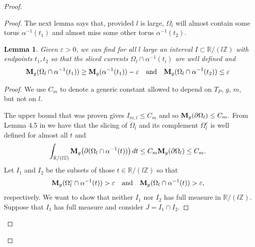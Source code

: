 \documentclass[11pt]{amsart}
\def\R{\mathbb R}
\def\Z{\mathbb Z}
\newtheorem{lemm}[thm]{Lemma}
\theoremstyle{remark}
\theoremstyle{definition}
\begin{document}
\begin{proof}
\begin{proof}
			{The next lemma says that, provided $l$ is large, $\Omega_l$ will almost contain some torus $\alpha^{-1}(t_1)$ and almost miss some other torus $\alpha^{-1}(t_2)$.}
			\begin{lemm}\label{slicing.argument} Given $\varepsilon>0$, we can find for all $l$ large an interval $I\subset \R/(l\Z)$ with endpoints $t_1,t_2$ so that the sliced currents $\Omega_l\cap \alpha^{-1}(t_i)$ are well defined and 
				$${\bf M}_g(\Omega_l\cap \alpha^{-1}(t_1))\geq {\bf M}_g(\alpha^{-1}(t_1))-\varepsilon\quad\text{and}\quad {\bf M}_g(\Omega_l\cap \alpha^{-1}(t_2))\leq \varepsilon$$
			\end{lemm}
			\begin{proof}
				We use $C_m$ to denote a generic constant allowed to depend on $T_P$, $g$, $m$, but not on $l$. 
				
				The upper bound that was proven gives $I_{m,l}\leq C_m$ and so
				$
				{\bf M}_g(\partial\Omega_l)\leq C_m.
				$
				From Lemma 4.5 in \cite{leon} we have that the slicing of $\Omega_l$ and its complement $\Omega_l^c$ is well defined for almost all $t$ and
				\begin{equation}\label{coarea}
					\int_{\R/(l\Z)}{\bf M}_g\bigl(\partial(\Omega_l\cap\alpha^{-1}(t))\bigr)\,dt\leq C_m{\bf M}_g(\partial\Omega_l)\leq C_m.
				\end{equation}
				Let $I_1$ and $I_2$  be the subsets of those $t\in \R/(l\Z)$ so that
				$${\bf M}_g( \Omega_l^c\cap\alpha^{-1}(t))>\varepsilon\quad\text{and}\quad {\bf M}_g(\Omega_l\cap\alpha^{-1}(t))>\varepsilon,$$
				respectively.
				We want to show that neither $I_1$ nor $I_2$  has full measure in $\R/(l\Z)$.  Suppose that $I_1$ has full measure and consider $J=I_1\cap I_2$.
				

\end{proof}
\end{proof}
\end{proof}
\end{document}
